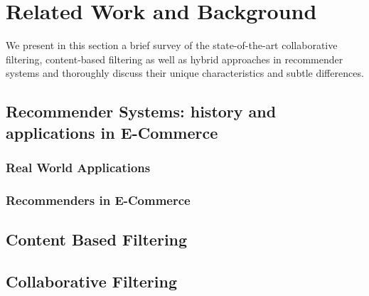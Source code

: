 
\chapter{Related Work and Background} %
\label{Chapter2} %

We present in this section a brief survey of the state-of-the-art collaborative filtering, content-based filtering as well as hybrid  approaches in recommender systems and thoroughly discuss their unique characteristics and subtle differences.  




\section{Recommender Systems: history and applications in E-Commerce}
\label{chp2-sec1}

\subsection{Real World Applications}
\label{chp2-sec1.1}



\subsection{Recommenders in E-Commerce}
\label{chp2-sec1.2}

\section{Content Based Filtering}
\label{chp2-sec2}

\section{Collaborative Filtering}
\label{chp2-sec3}

